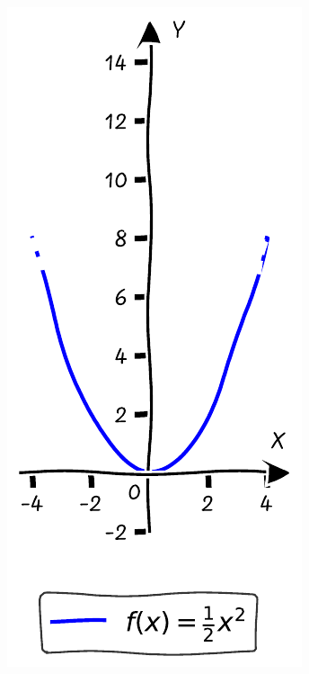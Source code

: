 \documentclass{tufte-handout}
\begin{document}
\begin{figure}[h]
\begin{minipage}{0.18\textwidth}
    \label{fig:first}
  \end{minipage}\hfill
  \begin{minipage}{0.18\textwidth}
    \includegraphics[width=\linewidth]{./graphs/quadratic_func_shrink_2.pdf}

\end{minipage}
\end{figure}
\end{document}
